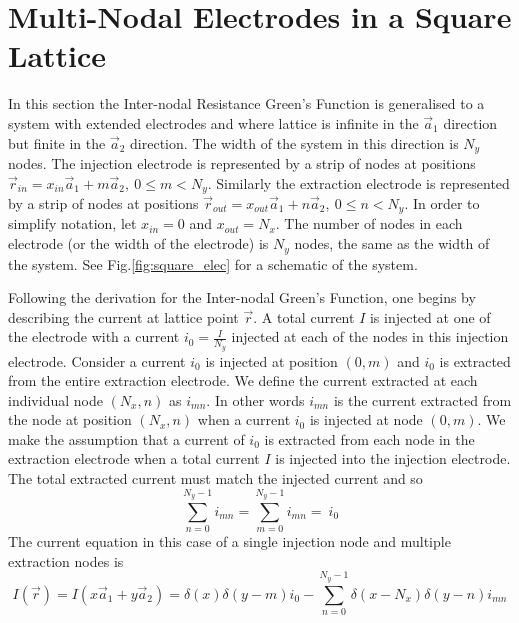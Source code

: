 \chapter{Multi-Nodal Electrodes in a Square Lattice}

In this section the Inter-nodal Resistance Green's Function is generalised to a system with extended electrodes and where lattice is infinite in the $\vec{a}_1$ direction but finite in the $\vec{a}_2$ direction. The width of the system in this direction is $N_y$ nodes. The injection electrode is represented by a strip of nodes at positions $\vec{r}_{in} = x_{in} \vec{a}_1 + m \vec{a}_2, ~ 0\leq m < N_y$. Similarly the extraction electrode is represented by a strip of nodes at positions $\vec{r}_{out} = x_{out} \vec{a}_1 + n \vec{a}_2, ~ 0\leq n < N_y$. In order to simplify notation, let $x_{in} = 0$ and $x_{out} = N_x$. The number of nodes in each electrode (or the width of the electrode) is $N_y$ nodes, the same as the width of the system. See Fig.\ref{fig:square_elec} for a schematic of the system.

Following the derivation for the Inter-nodal Green's Function, one begins by describing the current at lattice point $\vec{r}$. A total current $I$ is injected at one of the electrode with a current $i_0 = \frac{I}{N_y}$ injected at each of the nodes in this injection electrode. 
Consider a current $i_0$ is injected at position $(0,m)$ and $i_0$ is extracted from the  entire extraction electrode. We define the current extracted at each individual node $(N_x,n)$ as $i_{mn}$. In other words $i_{mn}$ is the current extracted from the node at position $(N_x,n)$ when a current $i_0$ is injected at node $(0,m)$. We make the assumption that a current of $i_0$ is extracted from each node in the extraction electrode when a total current $I$ is injected into the injection electrode. The total extracted current must match the injected current and so
\begin{equation}
\sum_{n=0}^{N_y-1} i_{mn}=\sum_{m=0}^{N_y-1} i_{mn}= ~i_0
\end{equation}
The current equation in this case of a single injection node and multiple extraction nodes is
\begin{equation}
I(\vec{r})=I(x\vec{a}_1 + y\vec{a}_2) =  \delta(x)\delta(y-m) i_0 - \sum_{n=0}^{N_y-1} \delta(x - N_x) \delta(y-n)  i_{mn}
\end{equation}

